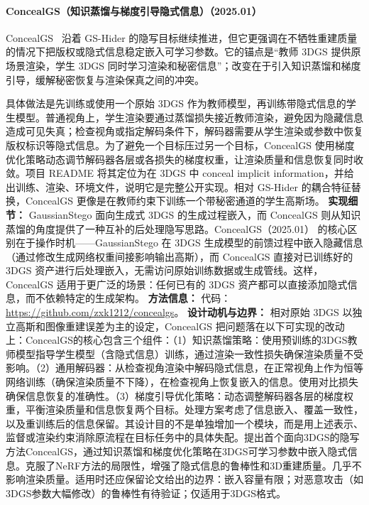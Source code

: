 \paragraph{ConcealGS（知识蒸馏与梯度引导隐式信息）（2025.01）}
ConcealGS~\cite{2501_03605} 沿着 GS-Hider 的隐写目标继续推进，但它更强调在不牺牲重建质量的情况下把版权或隐式信息稳定嵌入可学习参数。它的锚点是“教师 3DGS 提供原场景渲染，学生 3DGS 同时学习渲染和秘密信息”；改变在于引入知识蒸馏和梯度引导，缓解秘密恢复与渲染保真之间的冲突。

具体做法是先训练或使用一个原始 3DGS 作为教师模型，再训练带隐式信息的学生模型。普通视角上，学生渲染要通过蒸馏损失接近教师渲染，避免因为隐藏信息造成可见失真；检查视角或指定解码条件下，解码器需要从学生渲染或参数中恢复版权标识等隐式信息。为了避免一个目标压过另一个目标，ConcealGS 使用梯度优化策略动态调节解码器各层或各损失的梯度权重，让渲染质量和信息恢复同时收敛。项目 README 将其定位为在 3DGS 中 conceal implicit information，并给出训练、渲染、环境文件，说明它是完整公开实现。相对 GS-Hider 的耦合特征替换，ConcealGS 更像是在教师约束下训练一个带秘密通道的学生高斯场。
\textbf{实现细节：} GaussianStego 面向生成式 3DGS 的生成过程嵌入，而 ConcealGS 则从知识蒸馏的角度提供了一种互补的后处理隐写思路。ConcealGS（2025.01） 的核心区别在于操作时机——GaussianStego 在 3DGS 生成模型的前馈过程中嵌入隐藏信息（通过修改生成网络权重间接影响输出高斯），而 ConcealGS 直接对已训练好的 3DGS 资产进行后处理嵌入，无需访问原始训练数据或生成管线。这样，ConcealGS 适用于更广泛的场景：任何已有的 3DGS 资产都可以直接添加隐式信息，而不依赖特定的生成架构。
\textbf{方法信息：} 代码：\url{https://github.com/zxk1212/concealgs}。
\textbf{设计动机与边界：} 相对原始 3DGS 以独立高斯和图像重建误差为主的设定，ConcealGS 把问题落在以下可实现的改动上：ConcealGS的核心包含三个组件：（1）知识蒸馏策略：使用预训练的3DGS教师模型指导学生模型（含隐式信息）训练，通过渲染一致性损失确保渲染质量不受影响。（2）通用解码器：从检查视角渲染中解码隐式信息，在正常视角上作为恒等网络训练（确保渲染质量不下降），在检查视角上恢复嵌入的信息。使用对比损失确保信息恢复的准确性。（3）梯度引导优化策略：动态调整解码器各层的梯度权重，平衡渲染质量和信息恢复两个目标。处理方案考虑了信息嵌入、覆盖一致性，以及重训练后的信息保留。其设计目的不是单独增加一个模块，而是用上述表示、监督或渲染约束消除原流程在目标任务中的具体失配。提出首个面向3DGS的隐写方法ConcealGS，通过知识蒸馏和梯度优化策略在3DGS可学习参数中嵌入隐式信息。克服了NeRF方法的局限性，增强了隐式信息的鲁棒性和3D重建质量。几乎不影响渲染质量。适用时还应保留论文给出的边界：嵌入容量有限；对恶意攻击（如3DGS参数大幅修改）的鲁棒性有待验证；仅适用于3DGS格式。

